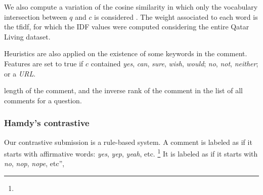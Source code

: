 We also compute a variation of the cosine similarity in which only the 
vocabulary intersection between $q$ and $c$ is considered . The 
weight associated to each word is the tfidf, for which the IDF values were 
computed considering the entire Qatar Living dataset.


Heuristics are also applied on the existence of some keywords in the comment. 
Features are set to true if $c$ contained
\Ni \textit{yes}, \textit{can}, \textit{sure}, \textit{wish}, \textit{would};
\Nii \textit{no}, \textit{not}, \textit{neither}; or 
\Niii  a \textit{URL}.





length of the comment, and the inverse rank of the comment in the list of all 
comments for a question.




\subsubsection{Hamdy's contrastive}

Our contrastive submission  is a rule-based system. A comment is 
labeled as \yes if it starts with affirmative words: \textit{yes}, 
\textit{yep}, \textit{yeah}, etc.%
\footnote{}
It is labeled as \no if it starts with \textit{no}, \textit{nop}, 
\textit{nope}, etc”, 

